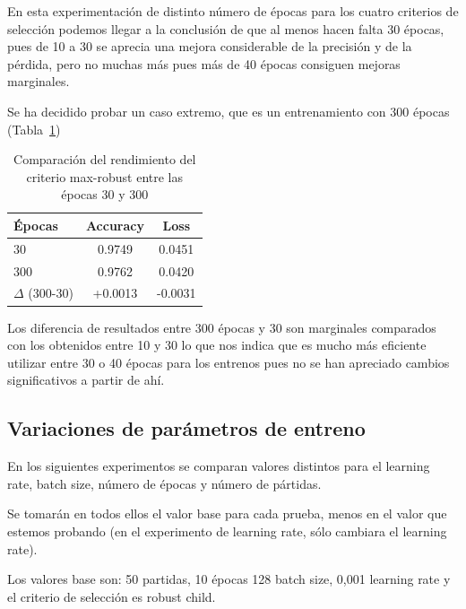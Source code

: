 \documentclass[conference,a4paper]{IEEEtran}
\begin{document}
En esta experimentación de distinto número de épocas para los cuatro criterios de selección podemos llegar a la conclusión de que al menos hacen falta 30 épocas, pues de 10 a 30 se aprecia una mejora considerable de la precisión y de la pérdida, pero no muchas más pues más de 40 épocas consiguen mejoras marginales.



Se ha decidido probar un caso extremo, que es un entrenamiento con 300 épocas (Tabla~\ref{tab:maxrobust_30_300})

\begin{table}[h]
\centering
\caption{Comparación del rendimiento del criterio max-robust entre las épocas 30 y 300}
\label{tab:maxrobust_30_300}
\begin{tabular}{lcc}
\hline
\textbf{Épocas} & \textbf{Accuracy} & \textbf{Loss} \\
\hline
30  & 0.9749 & 0.0451 \\
300 & 0.9762 & 0.0420 \\
\hline
$\Delta$ (300-30) & +0.0013 & -0.0031 \\
\hline
\end{tabular}
\end{table}

Los diferencia de resultados entre 300 épocas y 30 son marginales comparados con los obtenidos entre 10 y 30 lo que nos indica que es mucho más eficiente utilizar entre 30 o 40 épocas para los entrenos pues no se han apreciado cambios significativos a partir de ahí.


\subsection{Variaciones de parámetros de entreno}

En los siguientes experimentos se comparan valores distintos para el learning rate, batch size, número de épocas y número de pártidas.

Se tomarán en todos ellos el valor base para cada prueba, menos en el valor que estemos probando (en el experimento de learning rate, sólo cambiara el learning rate).

Los valores base son: 50 partidas, 10 épocas 128 batch size, 0,001 learning rate y el criterio de selección es robust child.
\end{document}
